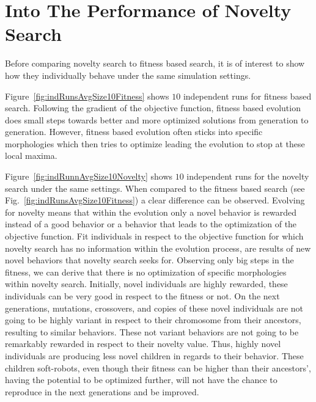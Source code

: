 \section{Into The Performance of Novelty Search}

Before comparing novelty search to fitness based search, it is of interest to show how they individually behave under the same simulation settings.

Figure~\ref{fig:indRunsAvgSize10Fitness} shows $10$ independent runs for fitness based search. Following the gradient of the objective function, fitness based evolution does small steps towards better and more optimized solutions from generation to generation. However, fitness based evolution often sticks into specific morphologies which then tries to optimize leading the evolution to stop at these local maxima.

Figure~\ref{fig:indRunnAvgSize10Novelty} shows $10$ independent runs for the novelty search under the same settings. When compared to the fitness based search (see Fig.~\ref{fig:indRunsAvgSize10Fitness}) a clear difference can be observed. Evolving for novelty means that within the evolution only a novel behavior is rewarded instead of a good behavior or a behavior that leads to the optimization of the objective function. Fit individuals in respect to the objective function for which novelty search has no information within the evolution process, are results of new novel behaviors that novelty search seeks for. Observing only big steps in the fitness, we can derive that there is no optimization of specific morphologies within novelty search. Initially, novel individuals are highly rewarded, these individuals can be very good in respect to the fitness or not. On the next generations, mutations, crossovers, and copies of these novel individuals are not going to be highly variant in respect to their chromosome from their ancestors, resulting to similar behaviors. These not variant behaviors are not going to be remarkably rewarded in respect to their novelty value. Thus, highly novel individuals are producing less novel children in regards to their behavior. These children soft-robots, even though their fitness can be higher than their ancestors', having the potential to be optimized further, will not have the chance to reproduce in the next generations and be improved. 


